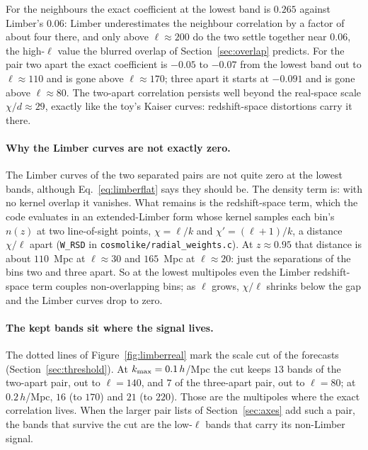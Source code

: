 \documentclass[11pt]{article}
\newcommand{\us}{\_\allowbreak}
\begin{document}
For the neighbours the exact coefficient at the lowest band is
$0.265$ against Limber's $0.06$: Limber underestimates the
neighbour correlation by a factor of about four there, and only
above $\ell \approx 200$ do the two settle together near $0.06$,
the high-$\ell$ value the blurred overlap of
Section~\ref{sec:overlap} predicts.  For the pair two apart the
exact coefficient is $-0.05$ to $-0.07$ from the lowest band out to
$\ell \approx 110$ and is gone above $\ell \approx 170$; three
apart it starts at $-0.091$ and is gone above $\ell \approx 80$.
The two-apart correlation persists well beyond the real-space scale
$\chi/d \approx 29$, exactly like the toy's Kaiser curves:
redshift-space distortions carry it there.

\paragraph{Why the Limber curves are not exactly zero.}
The Limber curves of the two separated pairs are not quite zero at
the lowest bands, although Eq.~\eqref{eq:limberflat} says they
should be.  The density term is: with no kernel overlap it
vanishes.  What remains is the redshift-space term, which the code
evaluates in an extended-Limber form whose kernel samples each
bin's $n(z)$ at two line-of-sight points, $\chi = \ell/k$ and
$\chi' = (\ell + 1)/k$, a distance $\chi/\ell$ apart
(\texttt{W\us RSD} in \texttt{cosmolike/radial\us weights.c}).  At
$z \approx 0.95$ that distance is about $110$~Mpc at
$\ell \approx 30$ and $165$~Mpc at $\ell \approx 20$: just the
separations of the bins two and three apart.  So at the lowest
multipoles even the Limber redshift-space term couples
non-overlapping bins; as $\ell$ grows, $\chi/\ell$ shrinks below
the gap and the Limber curves drop to zero.

\paragraph{The kept bands sit where the signal lives.}
The dotted lines of Figure~\ref{fig:limberreal} mark the scale cut
of the forecasts (Section~\ref{sec:threshold}).  At
$k_{\rm max} = 0.1\,h$/Mpc the cut keeps $13$ bands of the
two-apart pair, out to $\ell = 140$, and $7$ of the three-apart
pair, out to $\ell = 80$; at $0.2\,h$/Mpc, $16$ (to $170$) and $21$
(to $220$).  Those are the multipoles where the exact correlation
lives.  When the larger pair lists of Section~\ref{sec:axes} add
such a pair, the bands that survive the cut are the low-$\ell$
bands that carry its non-Limber signal.
\end{document}
